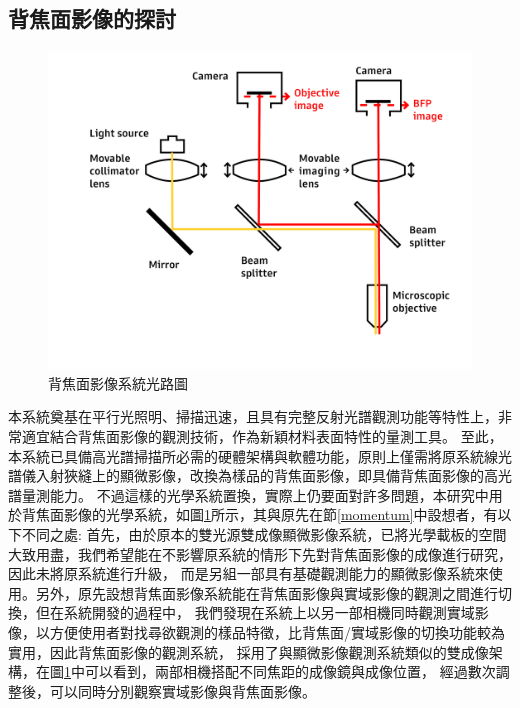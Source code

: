 \documentclass[12pt]{article}
\begin{document}
\subsection{背焦面影像的探討}
\begin{figure}
    \centering
    \includegraphics[width = 0.9\linewidth]{lightPath3.jpg}
    \caption{背焦面影像系統光路圖}
    \label{fig: bfp path}
\end{figure}
本系統奠基在平行光照明、掃描迅速，且具有完整反射光譜觀測功能等特性上，非常適宜結合背焦面影像的觀測技術，作為新穎材料表面特性的量測工具。
至此，本系統已具備高光譜掃描所必需的硬體架構與軟體功能，原則上僅需將原系統線光譜儀入射狹縫上的顯微影像，改換為樣品的背焦面影像，即具備背焦面影像的高光譜量測能力。
不過這樣的光學系統置換，實際上仍要面對許多問題，本研究中用於背焦面影像的光學系統，如圖\ref{fig: bfp path}所示，其與原先在節\ref{momentum}中設想者，有以下不同之處:
首先，由於原本的雙光源雙成像顯微影像系統，已將光學載板的空間大致用盡，我們希望能在不影響原系統的情形下先對背焦面影像的成像進行研究，因此未將原系統進行升級，
而是另組一部具有基礎觀測能力的顯微影像系統來使用。另外，原先設想背焦面影像系統能在背焦面影像與實域影像的觀測之間進行切換，但在系統開發的過程中，
我們發現在系統上以另一部相機同時觀測實域影像，以方便使用者對找尋欲觀測的樣品特徵，比背焦面/實域影像的切換功能較為實用，因此背焦面影像的觀測系統，
採用了與顯微影像觀測系統類似的雙成像架構，在圖\ref{fig: bfp path}中可以看到，兩部相機搭配不同焦距的成像鏡與成像位置，
經過數次調整後，可以同時分別觀察實域影像與背焦面影像。
\end{document}
